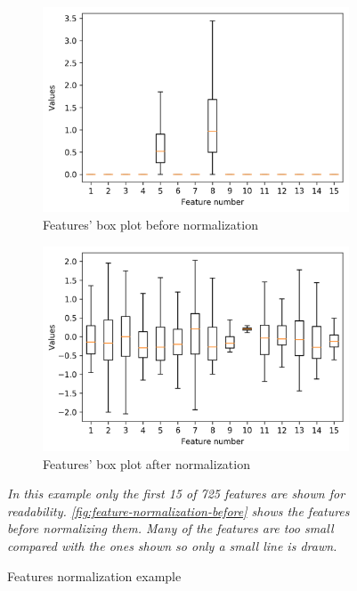 \begin{figure}
  \centering

  \begin{subfigure}[t]{.49\textwidth}
    \includegraphics[width=\textwidth]{images/features_original}

    \caption{Features' box plot before normalization \label{fig:feature-normalization-before}}
  \end{subfigure}
  \hfill
  \begin{subfigure}[t]{.49\textwidth}
    \includegraphics[width=\textwidth]{images/features_normalized}

    \caption{Features' box plot after normalization}
  \end{subfigure}

  \caption{Features normalization example \label{fig:feature-normalization}}

  \itshape\justify
  In this example only the first 15 of 725 features are shown for readability. 
  \autoref{fig:feature-normalization-before} shows the features before normalizing them. Many
  of the features are too small compared with the ones shown so only a small line is drawn.
  
\end{figure}


